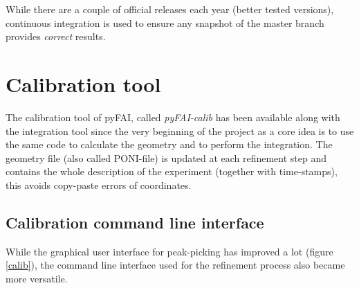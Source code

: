 \documentclass[preprint]{iucr}
\begin{document}
While there are a couple of official releases each year (better
tested versions), continuous integration is used to ensure any snapshot of the
master branch provides \textit{correct} results.

\section{Calibration tool}
\label{annex_calib}

The calibration tool of pyFAI, called \textit{pyFAI-calib} has been available
along with the integration tool since the very beginning of the project as a core idea
is to use the same code to calculate the geometry and to perform the integration.
The geometry file (also called PONI-file) is updated at each refinement step and
contains the whole description of the experiment (together with time-stamps),
this avoids copy-paste errors of coordinates.

\subsection{Calibration command line interface}

While the graphical user interface for peak-picking has improved a
lot (figure \ref{calib}), the command line interface used for the refinement
process also became more versatile.
\end{document}
